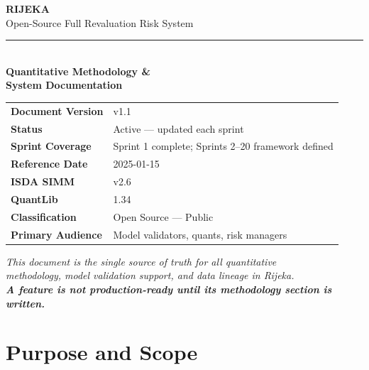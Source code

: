 \documentclass[11pt, a4paper]{article}
\begin{document}

\thispagestyle{empty}
\vspace*{3cm}
\begin{center}
  {\Huge\bfseries\color{navy} RIJEKA}\\[0.4cm]
  {\large\color{teal} Open-Source Full Revaluation Risk System}\\[0.2cm]
  \textcolor{mgrey}{\rule{12cm}{0.8pt}}\\[1cm]
  {\LARGE\bfseries\color{navy} Quantitative Methodology \&}\\[0.3cm]
  {\LARGE\bfseries\color{navy} System Documentation}\\[2cm]
  \begin{center}
  \begin{tabular}{ll}
    \toprule
    \textbf{Document Version} & v1.1 \\
    \textbf{Status}           & Active — updated each sprint \\
    \textbf{Sprint Coverage}  & Sprint 1 complete; Sprints 2–20 framework defined \\
    \textbf{Reference Date}   & 2025-01-15 \\
    \textbf{ISDA SIMM}        & v2.6 \\
    \textbf{QuantLib}         & 1.34 \\
    \textbf{Classification}   & Open Source — Public \\
    \textbf{Primary Audience} & Model validators, quants, risk managers \\
    \bottomrule
  \end{tabular}
  \end{center}
  \vspace{1.5cm}
  \textit{\color{dgrey}This document is the single source of truth for all quantitative\\
  methodology, model validation support, and data lineage in Rijeka.\\[0.2cm]
  \textbf{\color{teal}A feature is not production-ready until its methodology section is written.}}
\end{center}

\newpage
\tableofcontents
\newpage

\section{Purpose and Scope}
\end{document}
